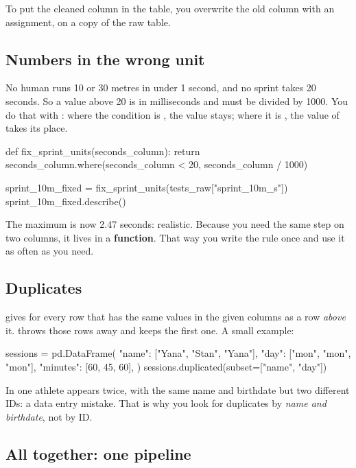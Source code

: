 \documentclass[11pt,a4paper]{article}
\begin{document}
To put the cleaned column in the table, you overwrite the old column
with an assignment, on a copy of the raw table.

\subsection{Numbers in the wrong unit}

No human runs 10 or 30 metres in under 1 second, and no sprint takes 20
seconds. So a value above 20 is in milliseconds and must be divided by
1000. You do that with : where the
condition is , the value stays; where it is , the
value of  takes its place.

\begin{python}
def fix_sprint_units(seconds_column):
    return seconds_column.where(seconds_column < 20, seconds_column / 1000)

sprint_10m_fixed = fix_sprint_units(tests_raw["sprint_10m_s"])
sprint_10m_fixed.describe()
\end{python}

The maximum is now 2.47 seconds: realistic. Because you need the same
step on two columns, it lives in a \textbf{function}. That way you write
the rule once and use it as often as you need.

\subsection{Duplicates}

 gives  for every row that has
the same values in the given columns as a row \emph{above} it.
 throws those rows
away and keeps the first one. A small example:

\begin{python}
sessions = pd.DataFrame({
    "name": ["Yana", "Stan", "Yana"],
    "day": ["mon", "mon", "mon"],
    "minutes": [60, 45, 60],
})
sessions.duplicated(subset=["name", "day"])
\end{python}

In  one athlete appears twice, with the same name and
birthdate but two different IDs: a data entry mistake. That is why you
look for duplicates by \emph{name and birthdate}, not by ID.

\subsection{All together: one pipeline}
\end{document}
